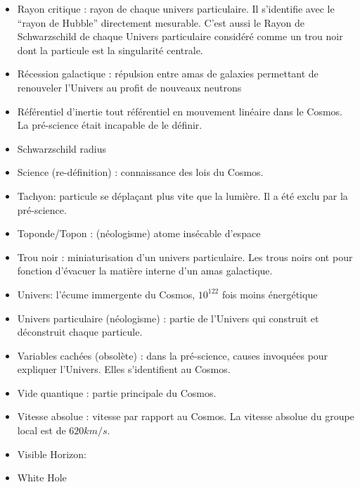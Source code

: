 \documentclass[a4paper,12pt]{article}
\begin{document}
\begin{appendix}
\begin{itemize}
\item Rayon critique : rayon de chaque univers particulaire. Il s’identifie avec le ``rayon de Hubble'' directement mesurable. C’est aussi le Rayon de Schwarzschild de chaque Univers particulaire considéré comme un trou noir dont la particule est la singularité centrale.
\item Récession galactique : répulsion entre amas de galaxies permettant de renouveler l’Univers au profit de nouveaux neutrons
\item Référentiel d’inertie tout référentiel en mouvement linéaire dans le Cosmos. La pré-science était incapable de le définir.
\item Schwarzschild radius
\item Science (re-définition) : connaissance des lois du Cosmos.
\item Tachyon: particule se déplaçant plus vite que la lumière. Il a été exclu par la pré-science.
\item Toponde/Topon : (néologisme) atome insécable d’espace
\item Trou noir : miniaturisation d’un univers particulaire. Les trous noirs ont pour fonction d’évacuer la matière interne d’un amas galactique.
\item Univers: l'écume immergente du Cosmos, $10^{122}$ fois moins énergétique
\item Univers particulaire (néologisme) : partie de l’Univers qui construit et déconstruit chaque particule.
\item Variables cachées (obsolète) : dans la pré-science, causes invoquées pour expliquer l’Univers. Elles s’identifient au Cosmos.
\item Vide quantique : partie principale du Cosmos.
\item Vitesse absolue : vitesse par rapport au Cosmos. La vitesse absolue du groupe local est de $620 km/s$.
\item Visible Horizon:
\item White Hole
\end{itemize}


\listoftables{}   %
\listoffigures{}



\end{appendix}
\end{document}
